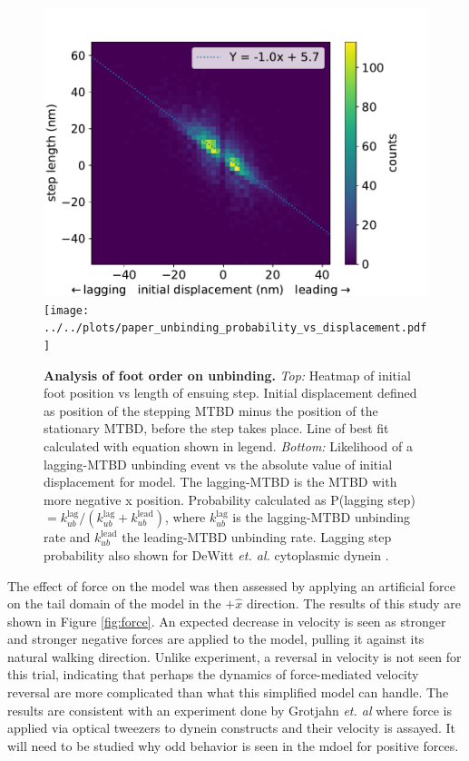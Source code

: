 \documentclass[9pt,twocolumn,twoside]{pnas-new}
\begin{document}
\begin{figure}[tbhp]
  \includegraphics[width=\linewidth]{../../plots/paper_displacement_vs_step_length.pdf}
  \texttt{[image: ../../plots/paper\_unbinding\_probability\_vs\_displacement.pdf]}
  \caption{\textbf{Analysis of foot order on unbinding.} \textit{Top: } Heatmap of initial foot position vs length of ensuing step. Initial displacement defined as position of the stepping MTBD minus the position of the stationary MTBD, before the step takes place. Line of best fit calculated with equation shown in legend. \textit{Bottom: } Likelihood of a lagging-MTBD unbinding event vs the absolute value of initial displacement for model. The lagging-MTBD is the MTBD with more negative x position. Probability calculated as P(lagging step)$ = k_{ub}^{\text{lag}} / \left(k_{ub}^{\text{lag}} + k_{ub}^{\text{lead}}\right)$, where $k_{ub}^{\text{lag}}$ is the lagging-MTBD unbinding rate and $k_{ub}^{\text{lead}}$ the leading-MTBD unbinding rate. Lagging step probability also shown for DeWitt \textit{et. al.} cytoplasmic dynein \cite{yildizpaper}.}
  \label{fig:tensiongating}
\end{figure}

The effect of force on the model was then assessed by applying an artificial force on the tail domain of the model in the $+\hat{x}$ direction. The results of this study are shown in Figure \ref{fig:force}. An expected decrease in velocity is seen as stronger and stronger negative forces are applied to the model, pulling it against its natural walking direction. Unlike experiment, a reversal in velocity is not seen for this trial, indicating that perhaps the dynamics of force-mediated velocity reversal are more complicated than what this simplified model can handle. The results are consistent with an experiment done by Grotjahn \textit{et. al} where force is applied via optical tweezers to dynein constructs and their velocity is assayed. It will need to be studied why odd behavior is seen in the mdoel for positive forces.\\
\end{document}

